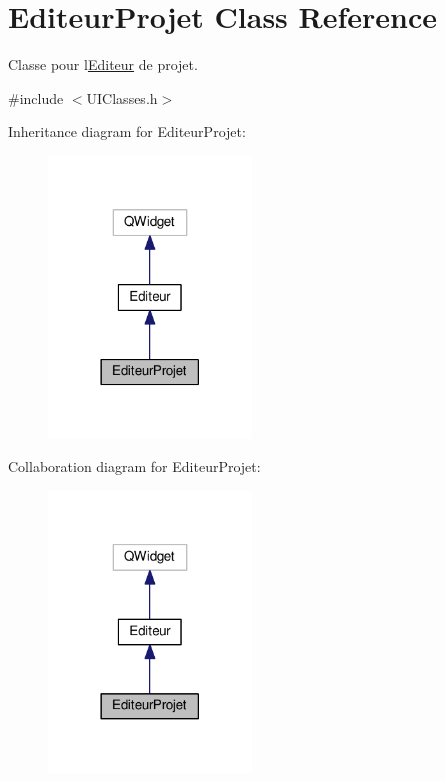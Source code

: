 \hypertarget{class_editeur_projet}{}\section{Editeur\+Projet Class Reference}
\label{class_editeur_projet}


Classe pour l\textquotesingle{}\hyperlink{class_editeur}{Editeur} de projet.  




{\ttfamily \#include $<$U\+I\+Classes.\+h$>$}



Inheritance diagram for Editeur\+Projet\+:\nopagebreak
\begin{figure}[H]
\begin{center}
\leavevmode
\includegraphics[width=153pt]{class_editeur_projet__inherit__graph}
\end{center}
\end{figure}


Collaboration diagram for Editeur\+Projet\+:\nopagebreak
\begin{figure}[H]
\begin{center}
\leavevmode
\includegraphics[width=153pt]{class_editeur_projet__coll__graph}
\end{center}
\end{figure}
